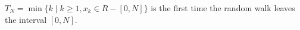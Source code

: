 \(T_N = \min\{k \mid k \geq 1, x_k \in R - [0,N]\}\) is the first time the random walk leaves the interval \([0,N]\).

